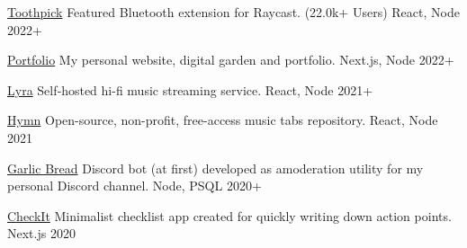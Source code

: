 

\begin{cvhonors}

  \cvhonor
    {\href{https://github.com/VladCuciureanu/Toothpick}{Toothpick}} %
    {Featured Bluetooth extension for Raycast. (22.0k+ Users)} %
    {React, Node} %
    {2022+} %

  \cvhonor
    {\href{https://github.com/VladCuciureanu/Portfolio}{Portfolio}} %
    {My personal website, digital garden and portfolio.} %
    {Next.js, Node} %
    {2022+} %

  \cvhonor
    {\href{https://github.com/VladCuciureanu/Lyra}{Lyra}} %
    {Self‑hosted hi-fi music streaming service.} %
    {React, Node} %
    {2021+} %

  \cvhonor
    {\href{https://github.com/VladCuciureanu/Hymn}{Hymn}} %
    {Open-source, non-profit, free-access music tabs repository.} %
    {React, Node} %
    {2021} %

  \cvhonor
    {\href{https://github.com/VladCuciureanu/GarlicBread}{Garlic Bread}} %
    {Discord bot (at first) developed as amoderation utility for my personal Discord channel.} %
    {Node, PSQL} %
    {2020+} %

  \cvhonor
    {\href{https://github.com/VladCuciureanu/CheckIt}{CheckIt}} %
    {Minimalist checklist app created for quickly writing down action points.} %
    {Next.js} %
    {2020} %

\end{cvhonors}
